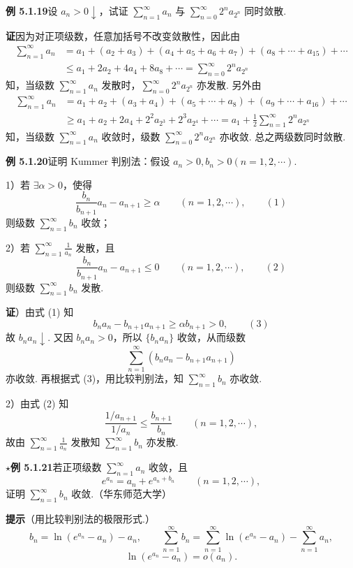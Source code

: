 \documentclass[UTF8,12pt,a4paper,fontset=fandol]{ctexart}
\begin{document}
\noindent\textbf{例 5.1.19}\quad 设 $a_n>0\downarrow$，试证 $\displaystyle\sum_{n=1}^\infty a_n$ 与 $\displaystyle\sum_{n=0}^\infty 2^n a_{2^n}$ 同时敛散.

\noindent\textbf{证}\quad 因为对正项级数，任意加括号不改变敛散性，因此由
\[
\begin{aligned}
\sum_{n=1}^\infty a_n
&=a_1+(a_2+a_3)+(a_4+a_5+a_6+a_7)+(a_8+\cdots+a_{15})+\cdots\\
&\le a_1+2a_2+4a_4+8a_8+\cdots
=\sum_{n=0}^\infty 2^n a_{2^n}
\end{aligned}
\]
知，当级数 $\displaystyle\sum_{n=1}^\infty a_n$ 发散时，$\displaystyle\sum_{n=0}^\infty 2^n a_{2^n}$ 亦发散. 另外由
\[
\begin{aligned}
\sum_{n=1}^\infty a_n
&=a_1+a_2+(a_3+a_4)+(a_5+\cdots+a_8)+(a_9+\cdots+a_{16})+\cdots\\
&\ge a_1+a_2+2a_4+2^2a_{2^3}+2^3a_{2^4}+\cdots
=a_1+\frac12\sum_{n=1}^\infty2^n a_{2^n}
\end{aligned}
\]
知，当级数 $\displaystyle\sum_{n=1}^\infty a_n$ 收敛时，级数 $\displaystyle\sum_{n=0}^\infty2^n a_{2^n}$ 亦收敛. 总之两级数同时敛散.

\noindent\textbf{例 5.1.20}\quad 证明 Kummer 判别法：假设 $a_n>0,b_n>0(n=1,2,\cdots)$.

1）若 $\exists\alpha>0$，使得
\[
  \frac{b_n}{b_{n+1}}a_n-a_{n+1}\ge\alpha\qquad(n=1,2,\cdots),
\qquad(1)
\]
则级数 $\displaystyle\sum_{n=1}^\infty b_n$ 收敛；

2）若 $\displaystyle\sum_{n=1}^\infty\frac1{a_n}$ 发散，且
\[
  \frac{b_n}{b_{n+1}}a_n-a_{n+1}\le0\qquad(n=1,2,\cdots),
\qquad(2)
\]
则级数 $\displaystyle\sum_{n=1}^\infty b_n$ 发散.

\noindent\textbf{证}）由式 (1) 知
\[
  b_na_n-b_{n+1}a_{n+1}\ge\alpha b_{n+1}>0,
\qquad(3)
\]
故 $b_na_n\downarrow$. 又因 $b_na_n>0$，所以 $\{b_na_n\}$ 收敛，从而级数
\[
  \sum_{n=1}^\infty(b_na_n-b_{n+1}a_{n+1})
\]
亦收敛. 再根据式 (3)，用比较判别法，知 $\displaystyle\sum_{n=1}^\infty b_n$ 亦收敛.

2）由式 (2) 知
\[
  \frac{1/a_{n+1}}{1/a_n}\le\frac{b_{n+1}}{b_n}\qquad(n=1,2,\cdots),
\]
故由 $\displaystyle\sum_{n=1}^\infty\frac1{a_n}$ 发散知 $\displaystyle\sum_{n=1}^\infty b_n$ 亦发散.

\noindent\textbf{$\star$例 5.1.21}\quad 若正项级数 $\displaystyle\sum_{n=1}^\infty a_n$ 收敛，且
\[
  e^{a_n}=a_n+e^{a_n+b_n}\qquad(n=1,2,\cdots),
\]
证明 $\displaystyle\sum_{n=1}^\infty b_n$ 收敛.（华东师范大学）

\noindent\textbf{提示}\quad （用比较判别法的极限形式.）
\[
  b_n=\ln(e^{a_n}-a_n)-a_n,\qquad
  \sum_{n=1}^\infty b_n=\sum_{n=1}^\infty\ln(e^{a_n}-a_n)-\sum_{n=1}^\infty a_n,
\]
\[
  \ln(e^{a_n}-a_n)=o(a_n).
\]
\end{document}
